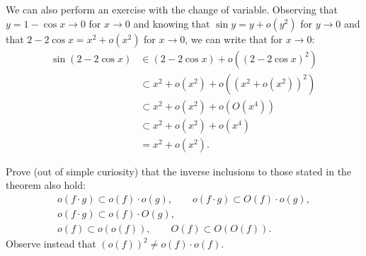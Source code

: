 \begin{example}
We can also perform an exercise with the change of variable.
Observing that $y=1-\cos x\to 0$ for $x\to 0$
and knowing that $\sin y = y + o(y^2)$ for $y\to 0$
and that $2-2\cos x = x^2 + o(x^2)$ for $x\to 0$,
we can write
that for $x\to 0$:
\begin{align*}
\sin(2-2\cos x)
& \in (2-2\cos x) + o((2-2\cos x)^2) \\
& \subset x^2 + o(x^2) + o((x^2+o(x^2))^2) \\
& \subset x^2 + o(x^2) + o(O(x^4)) \\
& \subset x^2 + o(x^2) + o(x^4) \\
& = x^2 + o(x^2).
\end{align*}
\end{example}

\begin{exercise}
Prove (out of simple curiosity) that the inverse inclusions to those stated in
the theorem also hold:
\begin{gather*}
o(f\cdot g) \subset o(f) \cdot o(g), \qquad
o(f\cdot g) \subset O(f) \cdot o(g), \\
o(f\cdot g) \subset o(f) \cdot O(g), \\
o(f) \subset o(o(f)),  \qquad
O(f) \subset O(O(f)).
\end{gather*}
Observe instead that $(o(f))^2 \neq o(f)\cdot o(f)$.
\end{exercise}

